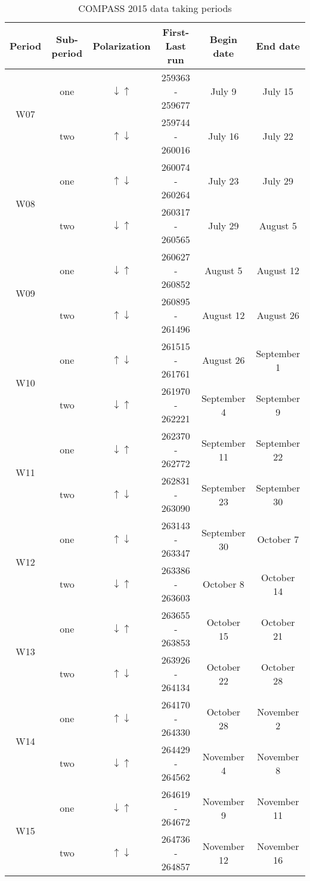 \begin{table}[h!t]
  \centering
    \begin{tabular}{ |c|c|c|c|c|c| }
      \hline Period& Sub-period& Polarization& First-Last run& Begin date& End
      date \\ \hline
      
      \multirow{2}{2em}{W07}& one& $\downarrow \uparrow$& 259363 - 259677& July
      9& July 15 \\ & two& $\uparrow \downarrow$& 259744 - 260016& July 16& July
      22 \\ \hline

      \multirow{2}{2em}{W08}& one& $\uparrow \downarrow$& 260074 - 260264& July
      23& July 29 \\ & two& $\downarrow \uparrow$& 260317 - 260565& July 29&
      August 5 \\ \hline

      \multirow{2}{2em}{W09}& one& $\downarrow \uparrow$& 260627 - 260852&
      August 5& August 12 \\ & two& $\uparrow \downarrow$& 260895 - 261496&
      August 12& August 26 \\ \hline

      \multirow{2}{2em}{W10}& one& $\uparrow \downarrow$& 261515 - 261761&
      August 26& September 1 \\ & two& $\downarrow \uparrow$& 261970 - 262221&
      September 4& September 9 \\ \hline

      \multirow{2}{2em}{W11}& one& $\downarrow \uparrow$& 262370 - 262772&
      September 11& September 22 \\ & two& $\uparrow \downarrow$& 262831 -
      263090& September 23& September 30 \\ \hline

      \multirow{2}{2em}{W12}& one& $\uparrow \downarrow$& 263143 - 263347&
      September 30& October 7 \\ & two& $\downarrow \uparrow$& 263386 - 263603&
      October 8& October 14 \\ \hline

      \multirow{2}{2em}{W13}& one& $\downarrow \uparrow$& 263655 - 263853&
      October 15& October 21 \\ & two& $\uparrow \downarrow$& 263926 - 264134&
      October 22& October 28 \\ \hline

      \multirow{2}{2em}{W14}& one& $\uparrow \downarrow$& 264170 - 264330&
      October 28& November 2 \\ & two& $\downarrow \uparrow$& 264429 - 264562&
      November 4& November 8 \\ \hline

      \multirow{2}{2em}{W15}& one& $\downarrow \uparrow$& 264619 - 264672&
      November 9& November 11 \\ & two& $\uparrow \downarrow$& 264736 - 264857&
      November 12& November 16 \\ \hline
      
    \end{tabular}
    \caption{COMPASS 2015 data taking periods}
    \label{tab::datataking}
\end{table}



